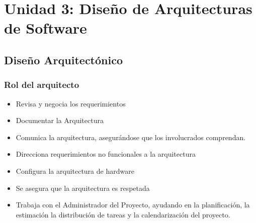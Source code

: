 \section{Unidad 3: Diseño de Arquitecturas de Software}
\subsection{Diseño Arquitectónico}
\subsubsection{Rol del arquitecto}
\begin{itemize}
\item Revisa y negocia los requerimientos
\item Documentar la Arquitectura
\item Comunica la arquitectura, asegurándose que los involucrados comprendan.
\item Direcciona requerimientos no funcionales a la arquitectura
\item Configura la arquitectura de hardware
\item Se asegura que la arquitectura es respetada
\item Trabaja con el Administrador del Proyecto, ayudando en la planificación, la estimación la distribución de tareas y la calendarización del proyecto.
\end{itemize}
